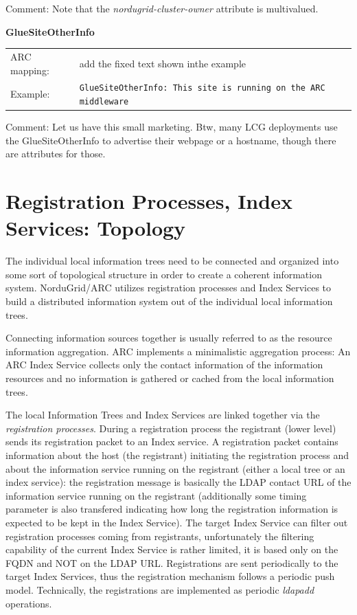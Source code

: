 \documentclass{article}
\begin{document}
Comment: Note that the {\it nordugrid-cluster-owner} attribute 
is multivalued.


\hspace*{0.5cm}
\begin{shaded}
 \textbf{GlueSiteOtherInfo} 
\end{shaded}
\begin{tabular}{lp{10cm}}  
  ARC mapping:&  add the fixed text shown inthe example\\
  Example:& \verb#GlueSiteOtherInfo: This site is running on the ARC middleware#\\
\end{tabular}

Comment: Let us have this small marketing.
Btw, many LCG deployments use the GlueSiteOtherInfo to advertise their webpage
or a hostname, though there are attributes for those.


\section{Registration Processes, Index Services: Topology}


The individual local information trees need to be connected and organized 
into some sort of topological structure in order to create
a coherent information system. NorduGrid/ARC utilizes registration 
processes and Index Services to build a distributed information system 
out of the individual local information trees. 

Connecting information sources together is usually referred to as the resource 
information aggregation. ARC implements a minimalistic aggregation process:
An ARC Index Service collects only the contact information of the 
information resources and no information is gathered or cached from the 
local information trees.
 

The local Information Trees and Index Services are linked together via the 
{\it registration processes}. During a registration process the registrant 
(lower level) sends its registration packet to an Index service.
A registration packet contains information about the host (the registrant) 
initiating the registration process and about the information service running 
on the registrant (either a local tree or an index service): the registration 
message is basically the LDAP contact URL of the information service 
running on the registrant
(additionally some timing parameter is also transfered indicating how long the 
registration information is expected to be kept in the Index Service).
The target Index Service can filter out registration processes coming from 
registrants, unfortunately the filtering capability of the current Index Service
is rather limited, it is based only on the FQDN and NOT on the
LDAP URL. Registrations are sent periodically to the target Index Services, 
thus the registration mechanism follows a periodic push model.
Technically, the registrations are implemented as periodic {\it ldapadd} operations.
\end{document}
